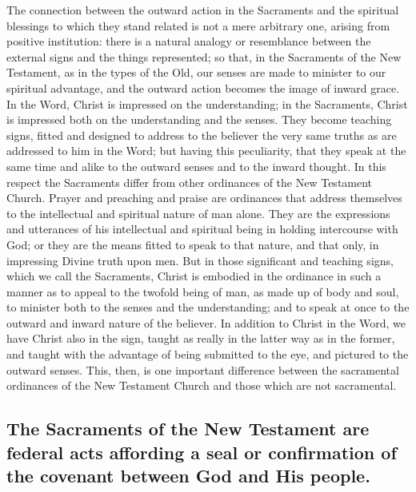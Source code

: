 \documentclass[english,]{book}
\begin{document}
The connection between the outward action in the Sacraments and the spiritual blessings to which they stand related is not a mere arbitrary one, arising from positive institution: there is a natural analogy or resemblance between the external signs and the things represented; so that, in the Sacraments of the New Testament, as in the types of the Old, our senses are made to minister to our spiritual advantage, and the outward action becomes the image of inward grace. In the Word, Christ is impressed on the understanding; in the Sacraments, Christ is impressed both on the understanding and the senses. They become teaching signs, fitted and designed to address to the believer the very same truths as are addressed to him in the Word; but having this peculiarity, that they speak at the same time and alike to the outward senses and to the inward thought. In this respect the Sacraments differ from other ordinances of the New Testament Church. Prayer and preaching and praise are ordinances that address themselves to the intellectual and spiritual nature of man alone. They are the expressions and utterances of his intellectual and spiritual being in holding intercourse with God; or they are the means fitted to speak to that nature, and that only, in impressing Divine truth upon men. But in those significant and teaching signs, which we call the Sacraments, Christ is embodied in the ordinance in such a manner as to appeal to the twofold being of man, as made up of body and soul, to minister both to the senses and the understanding; and to speak at once to the outward and inward nature of the believer. In addition to Christ in the Word, we have Christ also in the sign, taught as really in the latter way as in the former, and taught with the advantage of being submitted to the eye, and pictured to the outward senses. This, then, is one important difference between the sacramental ordinances of the New Testament Church and those which are not sacramental.

\hypertarget{the-sacraments-of-the-new-testament-are-federal-acts-affording-a-seal-or-confirmation-of-the-covenant-between-god-and-his-people.}{%
\subsection{The Sacraments of the New Testament are federal acts affording a seal or confirmation of the covenant between God and His people.}\label{the-sacraments-of-the-new-testament-are-federal-acts-affording-a-seal-or-confirmation-of-the-covenant-between-god-and-his-people.}}
\end{document}
